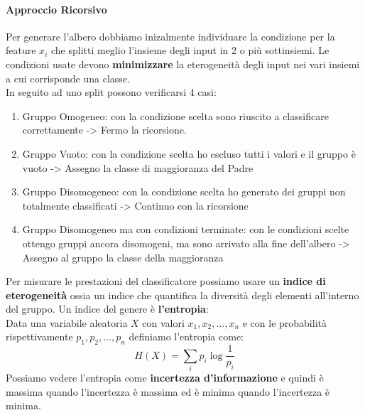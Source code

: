 \paragraph{Approccio Ricorsivo}
Per generare l'albero dobbiamo inizalmente individuare la condizione per la feature $x_i$ che splitti meglio l'insieme degli input in 2 o più sottinsiemi.
Le condizioni usate devono \textbf{minimizzare} la eterogeneità degli input nei vari insiemi a cui corrisponde una classe.\\
In seguito ad uno split possono verificarsi 4 casi:
\begin{enumerate}
    \item Gruppo Omogeneo: con la condizione scelta sono riuscito a classificare correttamente -> Fermo la ricorsione.
    \item Gruppo Vuoto: con la condizione scelta ho escluso tutti i valori e il gruppo è vuoto -> Assegno la classe di maggioranza del Padre
    \item Gruppo Disomogeneo: con la condizione scelta ho generato dei gruppi non totalmente classificati -> Continuo con la ricorsione
    \item Gruppo Disomogeneo ma con condizioni terminate: con le condizioni scelte ottengo gruppi ancora disomogeni, ma sono arrivato alla fine dell'albero -> Assegno al gruppo la classe della maggioranza
\end{enumerate}
Per misurare le prestazioni del classificatore possiamo usare un \textbf{indice di eterogeneità} ossia un indice che quantifica la diversità degli elementi 
all'interno del gruppo. Un indice del genere è \textbf{l'entropia}:\\
Data una variabile aleatoria $X$ con valori $x_1, x_2, \dots,x_n$ e con le probabilità rispettivamente $p_1,p_2,\dots,p_n$ definiamo l'entropia come:
\begin{equation}
    H(X) = \sum_{i} p_i \log \frac{1}{p_i}
\end{equation}
Possiamo vedere l'entropia come \textbf{incertezza d'informazione} e quindi è massima quando l'incertezza è massima ed è minima quando l'incertezza è minima.
